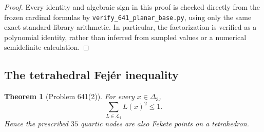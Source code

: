 \documentclass[11pt,a4paper]{article}
\newtheorem{theorem}{Theorem}[section]
\theoremstyle{definition}
\theoremstyle{remark}
\numberwithin{equation}{section}
\begin{document}
\begin{proof}
Every identity and algebraic sign in this proof is checked directly
from the frozen cardinal formulas by
\texttt{verify\_641\_planar\_base.py}, using only the same exact
standard-library arithmetic.  In particular, the factorization is
verified as a polynomial identity, rather than inferred from sampled
values or a numerical semidefinite calculation.
\end{proof}

\subsection{The tetrahedral Fej\'er inequality}

\begin{theorem}[Problem 641(2)]\label{thm:tetra-fejer}
For every $x\in\Delta_3$,
\begin{equation}\label{eq:tetra-fejer}
 \sum_{L\in\mathcal L_4}L(x)^2\le1.
\end{equation}
Hence the prescribed $35$ quartic nodes are also Fekete points on a
tetrahedron.
\end{theorem}
\end{document}
